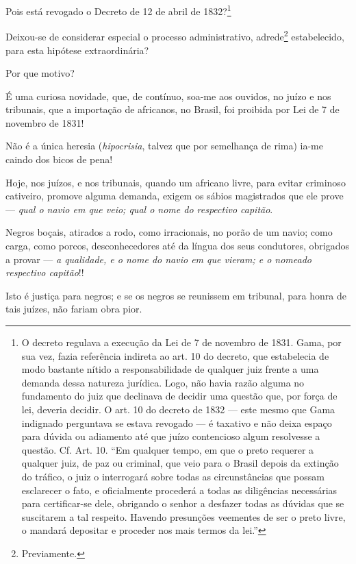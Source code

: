 Pois está revogado o Decreto de 12 de abril de 1832?\footnote{O
  decreto regulava a execução da Lei de 7 de novembro de 1831. Gama, por
  sua vez, fazia referência indireta ao art. 10 do decreto, que
  estabelecia de modo bastante nítido a responsabilidade de qualquer
  juiz frente a uma demanda dessa natureza jurídica. Logo, não havia
  razão alguma no fundamento do juiz que declinava de decidir uma
  questão que, por força de lei, deveria decidir. O art. 10 do decreto
  de 1832 --- este mesmo que Gama indignado perguntava se estava revogado
  --- é taxativo e não deixa espaço para dúvida ou adiamento até que juízo
  contencioso algum resolvesse a questão. Cf. Art. 10. ``Em qualquer
  tempo, em que o preto requerer a qualquer juiz, de paz ou criminal,
  que veio para o Brasil depois da extinção do tráfico, o juiz o
  interrogará sobre todas as circunstâncias que possam esclarecer o
  fato, e oficialmente procederá a todas as diligências necessárias para
  certificar-se dele, obrigando o senhor a desfazer todas as dúvidas que
  se suscitarem a tal respeito. Havendo presunções veementes de ser o
  preto livre, o mandará depositar e proceder nos mais termos da lei.''}

Deixou-se de considerar especial o processo administrativo,
adrede\footnote{Previamente.} estabelecido, para esta hipótese
extraordinária?

Por que motivo?

\asterisc

É uma curiosa novidade, que, de contínuo, soa-me aos ouvidos, no juízo e
nos tribunais, que a importação de africanos, no Brasil, foi proibida
por Lei de 7 de novembro de 1831!

Não é a única heresia (\emph{hipocrisia}, talvez que por semelhança de
rima) ia-me caindo dos bicos de pena!

Hoje, nos juízos, e nos tribunais, quando um africano livre, para evitar
criminoso cativeiro, promove alguma demanda, exigem os sábios
magistrados que ele prove --- \emph{qual o navio em que veio; qual o nome
do respectivo capitão}.

Negros boçais, atirados a rodo, como irracionais, no porão de um navio;
como carga, como porcos, desconhecedores até da língua dos seus
condutores, obrigados a provar --- \emph{a qualidade, e o nome do navio em
que vieram; e o nomeado respectivo capitão}!!

Isto é justiça para negros; e se os negros se reunissem em tribunal,
para honra de tais juízes, não fariam obra pior.

